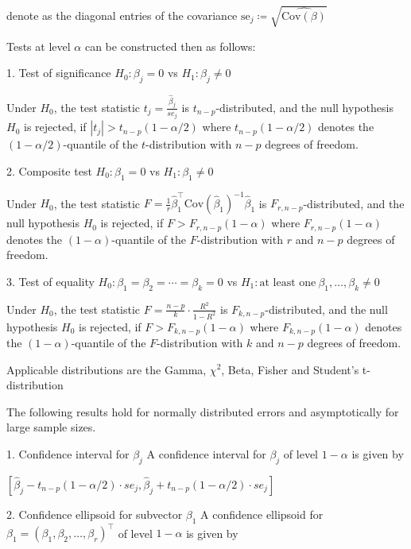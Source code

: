 denote as the diagonal entries of the covariance \( \text{se}_j \coloneqq \sqrt{\hat{\text{Cov}(\mathbb{\beta})}}\)

Tests at level \(\alpha\) can be constructed then as follows:

1. Test of significance \(H_0 : \beta_j = 0\) vs \(H_1 : \beta_j \neq 0\)

Under \(H_0\), the test statistic \(t_j = \frac{\hat{\beta}_j}{se_j}\) is \(t_{n - p}\)-distributed, and the null hypothesis \(H_0\) is rejected, if \(|t_j| > t_{n - p}(1 - \alpha/2)\) where \(t_{n - p}(1 - \alpha/2)\) denotes the \((1 - \alpha/2)\)-quantile of the \(t\)-distribution with \(n - p\) degrees of freedom.

2. Composite test \(H_0 : \beta_1 = 0\) vs \(H_1 : \beta_1 \neq 0\)

Under \(H_0\), the test statistic \(F = \frac{1}{r} \hat{\beta}_1^\top \text{Cov}(\hat{\beta}_1)^{-1} \hat{\beta}_1\) is \(F_{r, n - p}\)-distributed, and the null hypothesis \(H_0\) is rejected, if \(F > F_{r, n - p}(1 - \alpha)\) where \(F_{r, n - p}(1 - \alpha)\) denotes the \((1 - \alpha)\)-quantile of the \(F\)-distribution with \(r\) and \(n - p\) degrees of freedom.

3. Test of equality \(H_0 : \beta_1 = \beta_2 = \cdots = \beta_k = 0\) vs \(H_1 : \text{at least one} \ \beta_1, \ldots, \beta_k \neq 0\)

Under \(H_0\), the test statistic \(F = \frac{n - p}{k} \cdot \frac{R^2}{1 - R^2}\) is \(F_{k, n - p}\)-distributed, and the null hypothesis \(H_0\) is rejected, if \(F > F_{k, n - p}(1 - \alpha)\) where \(F_{k, n - p}(1 - \alpha)\) denotes the \((1 - \alpha)\)-quantile of the \(F\)-distribution with \(k\) and \(n - p\) degrees of freedom.


Applicable distributions are the Gamma, \(\chi^2\), Beta, Fisher and Student's t-distribution


The following results hold for normally distributed errors and asymptotically for large sample sizes.

1. Confidence interval for \(\beta_j\)
A confidence interval for \(\beta_j\) of level \(1 - \alpha\) is given by

\(
[\hat{\beta}_j - t_{n - p}(1 - \alpha/2) \cdot se_j, \hat{\beta}_j + t_{n - p}(1 - \alpha/2) \cdot se_j]
\)

2. Confidence ellipsoid for subvector \(\beta_1\)
A confidence ellipsoid for \(\beta_1 = (\beta_1, \beta_2, \ldots, \beta_r)^\top\) of level \(1 - \alpha\) is given by

